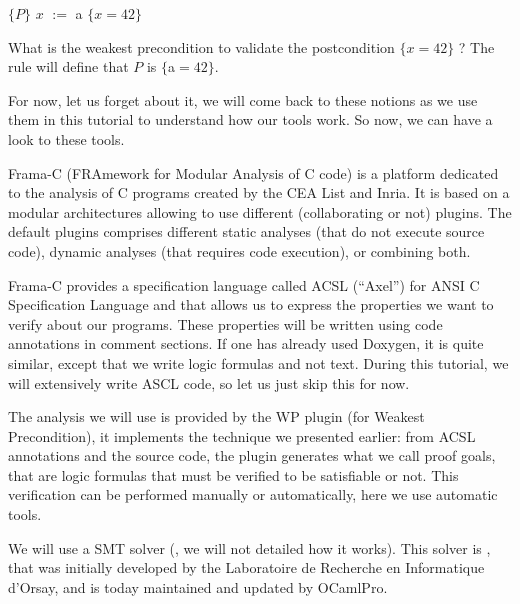\documentclass[middle]{zmdocument}
\begin{document}
$\{P\}$ $x$ $:=$ a $\{x = 42\}$



What is the weakest precondition to validate the postcondition
$\{x = 42\}$ ? The rule will define that $P$ is $\{$a$=42\}$.



For now, let us forget about it, we will come back to these notions as
we use them in this tutorial to understand how our tools work. So now,
we can have a look to these tools.






\begin{center}


\end{center}





Frama-C (FRAmework for Modular Analysis of C code) is a platform
dedicated to the analysis of C programs created by the CEA List and
Inria. It is based on a modular architectures allowing to use different
(collaborating or not) plugins. The default plugins comprises different
static analyses (that do not execute source code), dynamic analyses
(that requires code execution), or combining both.



Frama-C provides a specification language called ACSL (``Axel'') for
ANSI C Specification Language and that allows us to express the
properties we want to verify about our programs. These properties will
be written using code annotations in comment sections. If one has
already used Doxygen, it is quite similar, except that we write logic
formulas and not text. During this tutorial, we will extensively write
ASCL code, so let us just skip this for now.



The analysis we will use is provided by the WP plugin (for Weakest
Precondition), it implements the technique we presented earlier: from
ACSL annotations and the source code, the plugin generates what we call
proof goals, that are logic formulas that must be verified to be
satisfiable or not. This verification can be performed manually or
automatically, here we use automatic tools.



We will use a SMT solver
(, we will not detailed how it works). This solver is
, that was initially developed
by the Laboratoire de Recherche en Informatique d'Orsay, and is today
maintained and updated by OCamlPro.
\end{document}
